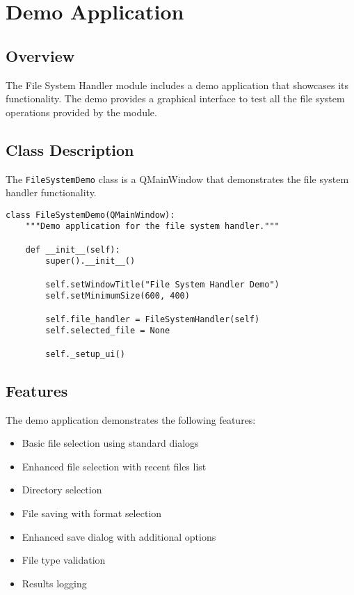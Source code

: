 \section{Demo Application}

\subsection{Overview}

The File System Handler module includes a demo application that showcases its functionality. The demo provides a graphical interface to test all the file system operations provided by the module.

\subsection{Class Description}

The \texttt{FileSystemDemo} class is a QMainWindow that demonstrates the file system handler functionality.

\begin{verbatim}
class FileSystemDemo(QMainWindow):
    """Demo application for the file system handler."""
    
    def __init__(self):
        super().__init__()
        
        self.setWindowTitle("File System Handler Demo")
        self.setMinimumSize(600, 400)
        
        self.file_handler = FileSystemHandler(self)
        self.selected_file = None
        
        self._setup_ui()
\end{verbatim}

\subsection{Features}

The demo application demonstrates the following features:

\begin{itemize}
    \item Basic file selection using standard dialogs
    \item Enhanced file selection with recent files list
    \item Directory selection
    \item File saving with format selection
    \item Enhanced save dialog with additional options
    \item File type validation
    \item Results logging
\end{itemize}

